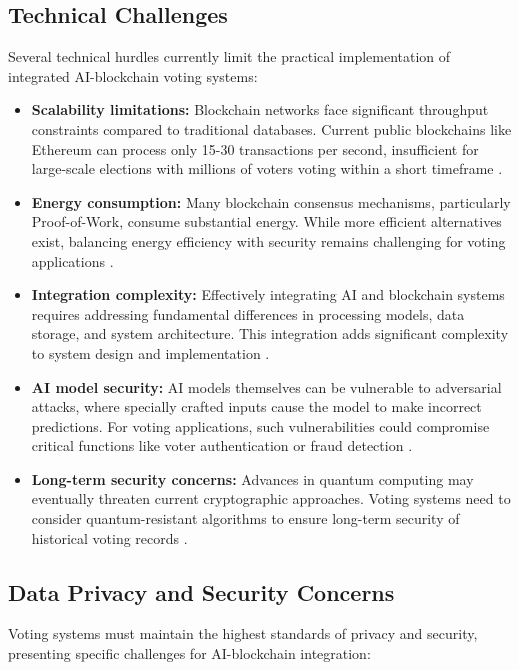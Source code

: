 \documentclass[conference]{IEEEtran}
\begin{document}
\subsection{Technical Challenges}
Several technical hurdles currently limit the practical implementation of integrated AI-blockchain voting systems:

\begin{itemize}
    \item \textbf{Scalability limitations:} Blockchain networks face significant throughput constraints compared to traditional databases. Current public blockchains like Ethereum can process only 15-30 transactions per second, insufficient for large-scale elections with millions of voters voting within a short timeframe \cite{b7}.
    
    \item \textbf{Energy consumption:} Many blockchain consensus mechanisms, particularly Proof-of-Work, consume substantial energy. While more efficient alternatives exist, balancing energy efficiency with security remains challenging for voting applications \cite{b9}.
    
    \item \textbf{Integration complexity:} Effectively integrating AI and blockchain systems requires addressing fundamental differences in processing models, data storage, and system architecture. This integration adds significant complexity to system design and implementation \cite{b10}.
    
    \item \textbf{AI model security:} AI models themselves can be vulnerable to adversarial attacks, where specially crafted inputs cause the model to make incorrect predictions. For voting applications, such vulnerabilities could compromise critical functions like voter authentication or fraud detection \cite{b13}.
    
    \item \textbf{Long-term security concerns:} Advances in quantum computing may eventually threaten current cryptographic approaches. Voting systems need to consider quantum-resistant algorithms to ensure long-term security of historical voting records \cite{b16}.
\end{itemize}

\subsection{Data Privacy and Security Concerns}
Voting systems must maintain the highest standards of privacy and security, presenting specific challenges for AI-blockchain integration:
\end{document}
